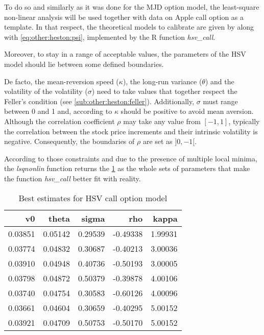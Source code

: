 \documentclass[12pt]{report}
\begin{document}
To do so and similarly as it was done for the MJD option model, the least-square non-linear analysis will be used together with data on Apple call option as a template.
In that respect, the theoretical models to calibrate are given by  along with \cref{eq:other:heston:psi}, implemented by the R function \textit{hsv\_call}.

Moreover, to stay in a range of acceptable values, the parameters of the HSV model should lie between some defined boundaries. 

De facto, the mean-reversion speed ($\kappa$), the long-run variance ($\theta$) and the volatility of the volatility ($\sigma$) need to take values that together respect the Feller's condition (see \cref{sub:other:heston:feller}). 
Additionally, $\sigma$ must range between 0 and 1 and, according to \citet{cristo2015} $\kappa$ should be positive to avoid mean aversion.
Although the correlation coefficient $\rho$ may take any value from $[-1, 1]$, typically the correlation between the stock price increments and their intrinsic volatility is negative. Consequently, the boundaries of $\rho$ are set as $]0, -1[$.

According to those constraints and due to the presence of multiple local minima, the \textit{lsqnonlin} function returns the \cref{t:methodology:call:heston:estimate1} as the whole sets of parameters that make the function \textit{hsv\_call} better fit with reality.

\begin{table}[ht]
\centering
\begin{tabular}{rrrrr}
  \hline
v0 & theta & sigma & rho & kappa \\ 
  \hline
  0.03851 & 0.05142 & 0.29539 & -0.49338 & 1.99931 \\ 
  0.03774 & 0.04832 & 0.30687 & -0.40213 & 3.00036 \\ 
  0.03910 & 0.04948 & 0.40736 & -0.50193 & 3.00005 \\ 
  0.03798 & 0.04872 & 0.50379 & -0.39878 & 4.00106 \\
  0.03740 & 0.04754 & 0.30583 & -0.60126 & 4.00096 \\ 
  0.03661 & 0.04604 & 0.30659 & -0.40295 & 5.00152 \\ 
  0.03921 & 0.04709 & 0.50753 & -0.50170 & 5.00152 \\ 
   \hline
\end{tabular}
\caption{Best estimates for HSV call option model} 
\label{t:methodology:call:heston:estimate1}
\end{table}
\end{document}
